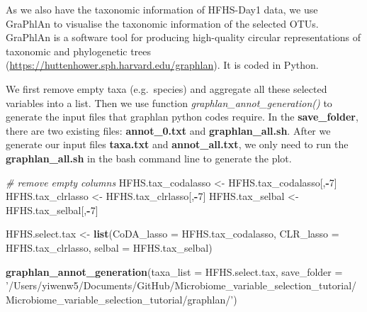 \documentclass[openany]{book}
\newenvironment{Shaded}{\begin{snugshade}}{\end{snugshade}}
\newcommand{\KeywordTok}[1]{\textcolor[rgb]{0.13,0.29,0.53}{\textbf{#1}}}
\newcommand{\DataTypeTok}[1]{\textcolor[rgb]{0.13,0.29,0.53}{#1}}
\newcommand{\DecValTok}[1]{\textcolor[rgb]{0.00,0.00,0.81}{#1}}
\newcommand{\StringTok}[1]{\textcolor[rgb]{0.31,0.60,0.02}{#1}}
\newcommand{\CommentTok}[1]{\textcolor[rgb]{0.56,0.35,0.01}{\textit{#1}}}
\newcommand{\OperatorTok}[1]{\textcolor[rgb]{0.81,0.36,0.00}{\textbf{#1}}}
\newcommand{\NormalTok}[1]{#1}
\begin{document}
As we also have the taxonomic information of HFHS-Day1 data, we use
GraPhlAn to visualise the taxonomic information of the selected OTUs.
GraPhlAn is a software tool for producing high-quality circular
representations of taxonomic and phylogenetic trees
(\url{https://huttenhower.sph.harvard.edu/graphlan}). It is coded in
Python.

We first remove empty taxa (e.g.~species) and aggregate all these
selected variables into a list. Then we use function
\emph{graphlan\_annot\_generation()} to generate the input files that
graphlan python codes require. In the \textbf{save\_folder}, there are
two existing files: \textbf{annot\_0.txt} and \textbf{graphlan\_all.sh}.
After we generate our input files \textbf{taxa.txt} and
\textbf{annot\_all.txt}, we only need to run the
\textbf{graphlan\_all.sh} in the bash command line to generate the plot.

\begin{Shaded}
\begin{Highlighting}[]
\CommentTok{# remove empty columns}
\NormalTok{HFHS.tax_codalasso <-}\StringTok{ }\NormalTok{HFHS.tax_codalasso[,}\OperatorTok{-}\DecValTok{7}\NormalTok{] }
\NormalTok{HFHS.tax_clrlasso <-}\StringTok{ }\NormalTok{HFHS.tax_clrlasso[,}\OperatorTok{-}\DecValTok{7}\NormalTok{]}
\NormalTok{HFHS.tax_selbal <-}\StringTok{ }\NormalTok{HFHS.tax_selbal[,}\OperatorTok{-}\DecValTok{7}\NormalTok{]}

\NormalTok{HFHS.select.tax <-}\StringTok{ }\KeywordTok{list}\NormalTok{(}\DataTypeTok{CoDA_lasso =}\NormalTok{ HFHS.tax_codalasso, }
                        \DataTypeTok{CLR_lasso =}\NormalTok{ HFHS.tax_clrlasso, }
                        \DataTypeTok{selbal =}\NormalTok{ HFHS.tax_selbal)}

\KeywordTok{graphlan_annot_generation}\NormalTok{(}\DataTypeTok{taxa_list =}\NormalTok{ HFHS.select.tax, }
\DataTypeTok{save_folder =} \StringTok{'/Users/yiwenw5/Documents/GitHub/Microbiome_variable_selection_tutorial/Microbiome_variable_selection_tutorial/graphlan/'}\NormalTok{)}
\end{Highlighting}
\end{Shaded}
\end{document}
